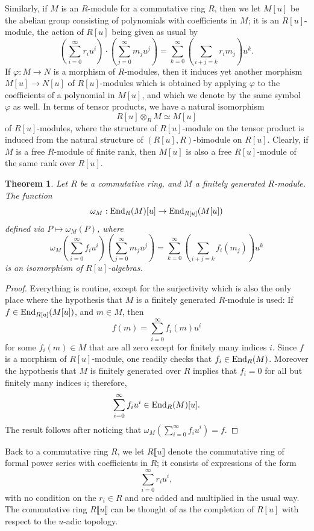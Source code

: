 \documentclass[11pt]{amsart}
\newtheorem{theorem}{Theorem}[section]
\numberwithin{equation}{section}
\theoremstyle{remark}
\theoremstyle{definition}
\begin{document}
Similarly, if $M$ is an $R$-module for a commutative ring $R$, then we let $M[u]$ be the abelian group consisting of polynomials with coefficients in $M$; it is an $R[u]$-module, the action of $R[u]$ being given as usual by
\begin{equation} \label{module_st}
\left(\sum_{i=0}^{\infty}r_{i}u^{i} \right) \cdot \left( \sum_{j=0}^{\infty} m_{j}u^{j}\right) = \sum_{k=0}^{\infty}\left(\sum_{i+j = k} r_{i} m_{j} \right) u^{k}.
\end{equation}
If $\varphi:M \rightarrow N$ is a morphism of $R$-modules, then it induces yet another morphism $M[u] \rightarrow N[u]$ of $R[u]$-modules which is obtained by applying $\varphi$ to the coefficients of a polynomial in $M[u]$, and which we denote by the same symbol $\varphi$ as well.  In terms of tensor products, we have a natural isomorphism 
$$R[u] \otimes_{R}M \simeq  M[u] $$
of $R[u]$-modules, where the structure of $R[u]$-module on the tensor product is induced from the natural structure of $(R[u],R)$-bimodule on $R[u]$.  Clearly, if $M$ is a free $R$-module of finite rank, then $M[u]$ is also a free $R[u]$-module of the same rank over $R[u]$. 
\begin{theorem} \label{conv_iso_pol_vs}
Let $R$ be a commutative ring, and $M$ a finitely generated $R$-module.  The function 
$$\omega_{M}:{\rm End}_{R}(M)[u] \rightarrow {\rm End}_{R[u]}(M[u])$$ 
defined via $P \mapsto \omega_{M}(P)$, where
$$\omega_{M}\left( \sum_{i=0}^{\infty}f_{i}u^{i}\right)\left(\sum_{j=0}^{\infty}m_{j}u^{j}\right) = \sum_{k=0}^{\infty} \left(\sum_{i+j = k}f_{i}(m_{j})\right)u^{k} $$
is an isomorphism of $R[u]$-algebras.
\end{theorem}
\begin{proof}
Everything is routine, except for the surjectivity which is also the only place where the hypothesis that $M$ is a finitely generated $R$-module is used:  If $f \in {\rm End}_{R[u]}(M[u])$, and $m \in M$, then
$$f(m) = \sum_{i=0}^{\infty}f_{i}(m)u^{i} $$
for some $f_{i}(m) \in M$ that are all zero except for finitely many indices $i$.  Since $f$ is a morphism of $R[u]$-module, one readily checks that $f_{i} \in {\rm End}_{R}(M)$.  Moreover the hypothesis that $M$ is finitely generated over $R$ implies that $f_{i}=0$ for all but finitely many indices $i$; therefore,
$$\sum_{i=0}^{\infty}f_{i}u^{i} \in {\rm End}_{R}(M)[u]. $$
The result follows after noticing that $\omega_{M} \left( \sum_{i=0}^{\infty}f_{i}u^{i}\right) = f$.
\end{proof}


Back to a commutative ring $R$, we let $R\llbracket u \rrbracket$ denote the commutative ring of formal power series with coefficients in $R$; it consists of expressions of the form
$$\sum_{i=0}^{\infty} r_{i}u^{i}, $$
with no condition on the $r_{i} \in R$ and are added and multiplied in the usual way.  The commutative ring $R\llbracket u \rrbracket$ can be thought of as the completion of $R[u]$ with respect to the $u$-adic topology. 
\end{document}
